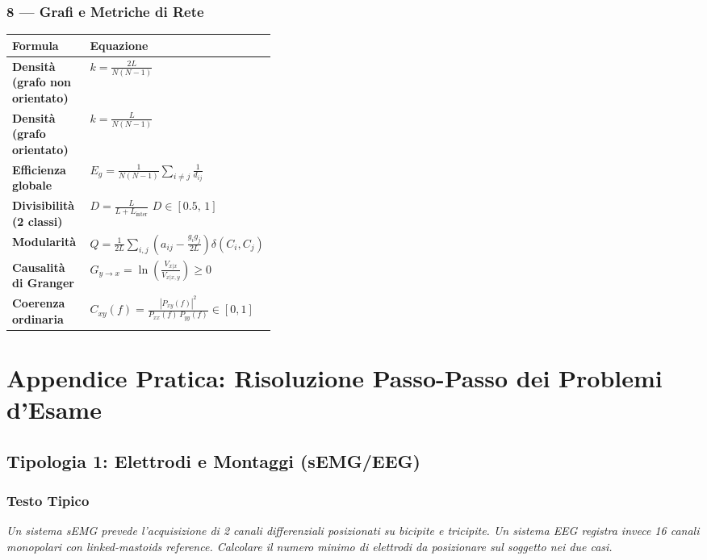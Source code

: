\documentclass[10pt, letterpaper]{report}
\begin{document}
\subsection*{\large 8 \;—\; Grafi e Metriche di Rete}
\begin{tabularx}{\linewidth}{>{\bfseries}p{0.38\linewidth} X}
\toprule
Formula & Equazione \\ \midrule
Densità (grafo non orientato) &
  $\displaystyle k = \frac{2L}{N(N-1)}$ \\
Densità (grafo orientato) &
  $\displaystyle k = \frac{L}{N(N-1)}$ \\
Efficienza globale &
  $\displaystyle E_g
   = \frac{1}{N(N-1)}\sum_{i\neq j}\frac{1}{d_{ij}}$ \\
Divisibilità (2 classi) &
  $\displaystyle D
   = \frac{L}{L+L_{\mathrm{inter}}}$
  \quad $D\in[0.5,\,1]$ \\
Modularità &
  $\displaystyle Q
   = \frac{1}{2L}\sum_{i,j}\!\left(a_{ij}
     -\frac{g_i g_j}{2L}\right)\!\delta(C_i,C_j)$ \\
Causalità di Granger &
  $\displaystyle G_{y\to x}
   = \ln\!\left(\frac{V_{x|x}}{V_{x|x,y}}\right) \ge 0$ \\
Coerenza ordinaria &
  $\displaystyle C_{xy}(f)
   = \frac{|P_{xy}(f)|^2}{P_{xx}(f)\,P_{yy}(f)}
   \in [0,1]$ \\
\bottomrule
\end{tabularx}

\renewcommand{\arraystretch}{1.0}


\newpage
\chapter*{Appendice Pratica: Risoluzione Passo-Passo dei Problemi d'Esame}

\section{Tipologia 1: Elettrodi e Montaggi (sEMG/EEG)}

\subsection*{Testo Tipico}
\emph{Un sistema sEMG prevede l'acquisizione di 2 canali differenziali posizionati su bicipite e tricipite.
Un sistema EEG registra invece 16 canali monopolari con linked-mastoids reference.
Calcolare il numero minimo di elettrodi da posizionare sul soggetto nei due casi.}
\end{document}

